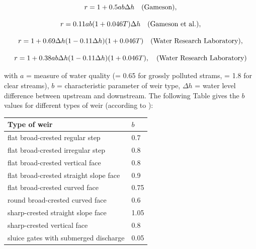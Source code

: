 \begin{equation}
  r = 1 + 0.5 a b \Delta h \quad \rm{(Gameson)},
\end{equation}

\begin{equation}
  r = 0.11 a b (1+0.046 T) \Delta h \quad \rm{(Gameson~et~al.)},
\end{equation}

\begin{equation}
  r = 1 + 0.69 \Delta h (1 - 0.11 \Delta h) (1 +0.046 T) \quad \rm{(Water~Research~Laboratory)},
\end{equation}

\begin{equation}
  r = 1 + 0.38 a b  \Delta h (1 - 0.11 \Delta h) (1 +0.046 T),
  \quad \rm{(Water~Research~Laboratory)}
\end{equation}

with $a$ = measure of water quality (= 0.65 for grossly polluted strams,
= 1.8 for clear streams),
$b$ = characteristic parameter of weir type,
$\Delta h$ = water level difference between upstream and downstream.
The following Table gives the $b$ values for different types of weir (according to \cite{mccutcheon_wq_1989}):\\

\begin{table}[H]
 			\centering
\begin{tabular}{p{3.0in}p{3.0in}}
\hline
\multicolumn{1}{|p{3.0in}}{Type of weir} & 
\multicolumn{1}{|p{3.0in}|}{$b$} \\
\hline
\multicolumn{1}{|p{3.0in}}{flat broad-crested regular step} & 
\multicolumn{1}{|p{3.0in}|}{0.7} \\
\hline
\multicolumn{1}{|p{3.0in}}{flat broad-crested irregular step} & 
\multicolumn{1}{|p{3.0in}|}{0.8} \\
\hline
\multicolumn{1}{|p{3.0in}}{flat broad-crested vertical face} & 
\multicolumn{1}{|p{3.0in}|}{0.8} \\
\hline
\multicolumn{1}{|p{3.0in}}{flat broad-crested straight slope face} & 
\multicolumn{1}{|p{3.0in}|}{0.9} \\
\hline
\multicolumn{1}{|p{3.0in}}{flat broad-crested curved face} & 
\multicolumn{1}{|p{3.0in}|}{0.75} \\
\hline
\multicolumn{1}{|p{3.0in}}{round broad-crested curved face} & 
\multicolumn{1}{|p{3.0in}|}{0.6} \\
\hline
\multicolumn{1}{|p{3.0in}}{sharp-crested straight slope face} & 
\multicolumn{1}{|p{3.0in}|}{1.05} \\
\hline
\multicolumn{1}{|p{3.0in}}{sharp-crested vertical face} & 
\multicolumn{1}{|p{3.0in}|}{0.8} \\
\hline
\multicolumn{1}{|p{3.0in}}{sluice gates with submerged discharge} & 
\multicolumn{1}{|p{3.0in}|}{0.05} \\
\hline

\end{tabular}
\end{table}


